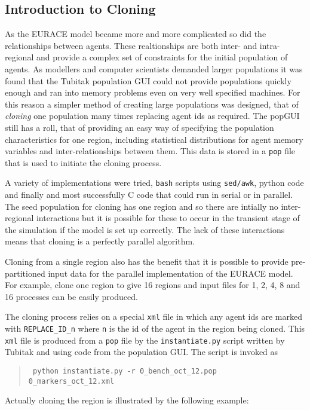 \subsection{Introduction to Cloning}
\label{sec:cloning}

As the EURACE model became more and more complicated so did the relationships between agents. These realtionships are both inter- and intra- regional and provide a complex set of constraints for the initial population of agents. As modellers and computer scientists demanded larger populations it was found that the Tubitak population GUI could not provide populations quickly enough and ran into memory problems even on very well specified machines. For this reason a simpler method of creating large populations was designed, that of \textit{cloning} one population many times replacing agent ids as required. The popGUI still has a roll, that of providing an easy way of specifying the population characteristics for one region, including statistical distributions for agent memory variables and inter-relationships between them. This data is stored in a \texttt{pop} file that is used to initiate the cloning process.

A variety of implementations were tried, \texttt{bash} scripts using \texttt{sed/awk}, python code and finally and most successfully C code that could run in serial or in parallel. The seed population for cloning has one region and so there are intially no inter-regional interactions but it is possible for these to occur in the transient stage of the simulation if the model is set up correctly. The lack of these interactions means that cloning is a perfectly parallel algorithm.

Cloning from a single region also has the benefit that it is possible to provide pre-partitioned input data for the parallel implementation of the EURACE model. For example, clone one region to give 16 regions and input files for 1, 2, 4, 8 and 16 processes can be easily produced.

The cloning process relies on a special \texttt{xml} file in which any agent ids are marked with \texttt{REPLACE\_ID\_n} where \texttt{n} is the id of the agent in the region being cloned. This \texttt{xml} file is produced from a \texttt{pop} file by the \texttt{instantiate.py} script written by Tubitak and using code from the population GUI. The script is invoked as
\begin {quote}
\tt
python instantiate.py -r 0\_bench\_oct\_12.pop 0\_markers\_oct\_12.xml
\end{quote}
Actually cloning the region is illustrated by the following example:

